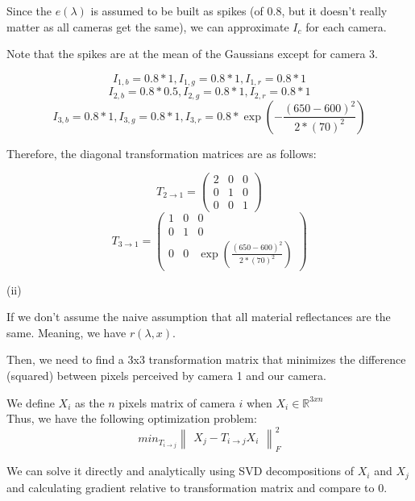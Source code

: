 \documentclass{homework}
\begin{document}
Since the $e(\lambda)$ is assumed to be built as spikes (of 0.8, but it doesn't really matter as all cameras get the same), we can approximate $I_c$ for each camera.

Note that the spikes are at the mean of the Gaussians except for camera 3.

$$I_{1,b}=0.8*1, I_{1,g}=0.8*1, I_{1,r}=0.8*1$$
$$I_{2,b}=0.8*0.5, I_{2,g}=0.8*1, I_{2,r}=0.8*1$$
$$I_{3,b}=0.8*1, I_{3,g}=0.8*1, I_{3,r}=0.8*\exp{(-\frac{(650-600)^2}{2*(70)^2})}$$

Therefore, the diagonal transformation matrices are as follows:

$$T_{2\rightarrow1}= \begin{pmatrix} 
    2 & 0 & 0 \\ 
    0 & 1 & 0 \\ 
    0 & 0 & 1 
\end{pmatrix}$$
$$T_{3\rightarrow1}= \begin{pmatrix} 
    1 & 0 & 0 \\ 
    0 & 1 & 0 \\ 
    0 & 0 & \exp{(\frac{(650-600)^2}{2*(70)^2})} 
\end{pmatrix}$$

(ii)

If we don't assume the naive assumption that all material reflectances are the same. Meaning, we have $r(\lambda,x)$.

Then, we need to find a 3x3 transformation matrix that minimizes the difference (squared) between pixels perceived by camera 1 and our camera.

We define $X_i$ as the $n$ pixels matrix of camera $i$ when $X_i\in \mathbb{R}^{3xn}$\\
Thus, we have the following optimization problem:
$$min_{T_{i\rightarrow j}}{\begin{Vmatrix}X_j-T_{i\rightarrow j}X_i\end{Vmatrix}}_F^2$$

We can solve it directly and analytically using SVD decompositions of $X_i$ and $X_j$ and calculating gradient relative to transformation matrix and compare to 0.
\end{document}
